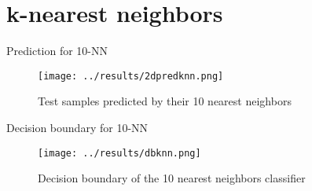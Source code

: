 \section{k-nearest neighbors}

\begin{frame}{Prediction for 10-NN}
  \begin{figure}[!htbp]
    \centering
    \small{\caption{Test samples predicted by their 10 nearest neighbors}}
    \texttt{[image: ../results/2dpredknn.png]}
  \end{figure}

  \note{ }

\end{frame}

\begin{frame}{Decision boundary for 10-NN}
  \begin{figure}[!htbp]
    \centering
    \small{\caption{Decision boundary of the 10 nearest neighbors classifier}}
    \texttt{[image: ../results/dbknn.png]}
  \end{figure}


\end{frame}
